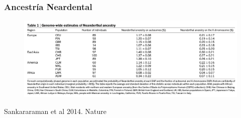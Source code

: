 \documentclass{beamer}\usepackage[]{graphicx}\usepackage[]{color}
\begin{document}
\begin{frame}[fragile]
\frametitle{Ancestr\'ia Neardental}

\begin{figure}[htbp]
\begin{center}
\includegraphics[width=1\linewidth]{near2.png}
\end{center}
\end{figure}

Sankararaman et al 2014. Nature
\end{frame}
\end{document}
